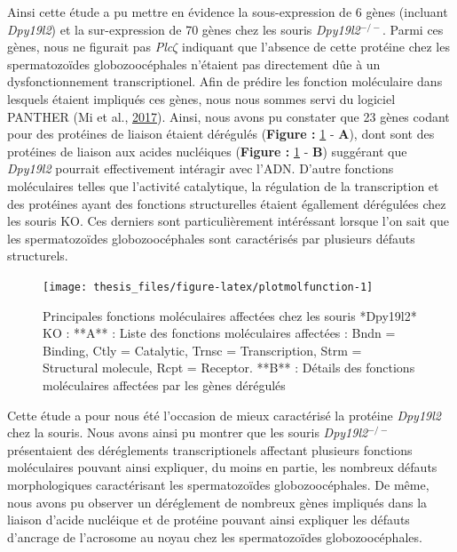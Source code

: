 \documentclass[12pt,twoside]{reedthesis}
\theoremstyle{definition}
\theoremstyle{definition}
\theoremstyle{remark}
\begin{document}
  Ainsi cette étude a pu mettre en évidence la sous-expression de 6 gènes
  (incluant \emph{Dpy19l2}) et la sur-expression de 70 gènes chez les
  souris \emph{Dpy19l2}\(^{-/-}\). Parmi ces gènes, nous ne figurait pas
  \emph{Plc}\(\zeta\) indiquant que l'absence de cette protéine chez les
  spermatozoïdes globozoocéphales n'étaient pas directement dûe à un
  dysfonctionnement transcriptionel. Afin de prédire les fonction
  moléculaire dans lesquels étaient impliqués ces gènes, nous nous sommes
  servi du logiciel PANTHER (Mi et al.,
  \protect\hyperlink{ref-Mi2017}{2017}). Ainsi, nous avons pu constater
  que 23 gènes codant pour des protéines de liaison étaient dérégulés
  (\textbf{Figure : }\ref{fig:plotmolfunction} - \textbf{A}), dont sont
  des protéines de liaison aux acides nucléiques (\textbf{Figure :
  }\ref{fig:plotmolfunction} - \textbf{B}) suggérant que \emph{Dpy19l2}
  pourrait effectivement intéragir avec l'ADN. D'autre fonctions
  moléculaires telles que l'activité catalytique, la régulation de la
  transcription et des protéines ayant des fonctions structurelles étaient
  égallement dérégulées chez les souris KO. Ces derniers sont
  particulièrement intéréssant lorsque l'on sait que les spermatozoïdes
  globozoocéphales sont caractérisés par plusieurs défauts structurels.
  
  \begin{figure}
  
  {\centering \texttt{[image: thesis\_files/figure-latex/plotmolfunction-1]} 
  
  }
  
  \caption[Principales fonctions moléculaires affectées chez les souris *Dpy19l2* KO]{Principales fonctions moléculaires affectées chez les souris *Dpy19l2* KO  :  **A** : Liste des fonctions moléculaires affectées : Bndn = Binding, Ctly = Catalytic, Trnsc = Transcription, Strm = Structural molecule, Rcpt = Receptor. **B** : Détails des fonctions moléculaires affectées par les gènes dérégulés}\label{fig:plotmolfunction}
  \end{figure}
  
  \newpage 
  
  Cette étude a pour nous été l'occasion de mieux caractérisé la protéine
  \emph{Dpy19l2} chez la souris. Nous avons ainsi pu montrer que les
  souris \emph{Dpy19l2}\(^{-/-}\) présentaient des déréglements
  transcriptionels affectant plusieurs fonctions moléculaires pouvant
  ainsi expliquer, du moins en partie, les nombreux défauts morphologiques
  caractérisant les spermatozoïdes globozoocéphales. De même, nous avons
  pu observer un déréglement de nombreux gènes impliqués dans la liaison
  d'acide nucléique et de protéine pouvant ainsi expliquer les défauts
  d'ancrage de l'acrosome au noyau chez les spermatozoïdes
  globozoocéphales.
  
\end{document}
